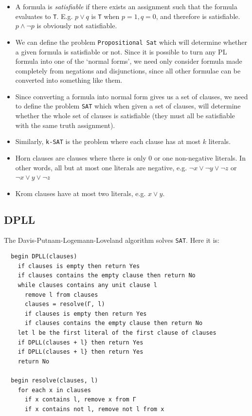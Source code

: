 \begin{itemize}
  \item A formula is \textit{satisfiable} if there exists an assignment such 
  that the formula evaluates to \texttt{T}. E.g. $p \vee q$ is \texttt{T} when $
  p = 1, q = 0$, and therefore is satisfiable. $p \wedge \neg p$ is obviously 
  not satisfiable.

  \item We can define the problem \texttt{Propositional Sat} which will 
  determine whether a given formula is satisfiable or not. Since it is possible 
  to turn any PL formula into one of the `normal forms', we need only consider 
  formula made completely from negations and disjunctions, since all other 
  formulae can be converted into something like them.

  \item Since converting a formula into normal form gives us a set of clauses, 
  we need to define the problem \texttt{SAT} which when given a set of clauses, 
  will determine whether the whole set of clauses is satisfiable (they must all 
  be satisfiable with the same truth assignment).

  \item Similarly, \texttt{k-SAT} is the problem where each clause has at most
  $k$ literals.


  \item Horn clauses are clauses where there is only 0 or one non-negative 
  literals. In other words, all but at most one literals are negative, e.g.
  $\neg x \vee \neg y \vee \neg z$ or $\neg x \vee y \vee \neg z$

  \item Krom clauses have at most two literals, e.g. $x \vee y$.
\end{itemize}

\subsection{DPLL}

The Davis-Putnam-Logemann-Loveland algorithm solves \texttt{SAT}. Here it is:

\begin{verbatim}
  begin DPLL(clauses)
    if clauses is empty then return Yes
    if clauses contains the empty clause then return No
    while clauses contains any unit clause l
      remove l from clauses
      clauses = resolve(Γ, l)
      if clauses is empty then return Yes
      if clauses contains the empty clause then return No
    let l be the first literal of the first clause of clauses
    if DPLL(clauses + l} then return Yes
    if DPLL(clauses + l} then return Yes
    return No

  begin resolve(clauses, l)
    for each x in clauses
      if x contains l, remove x from Γ
      if x contains not l, remove not l from x
\end{verbatim}

